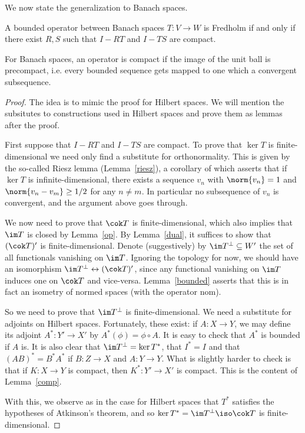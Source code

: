 \documentclass[12pt]{article}
\begin{document}
We now state the generalization to Banach spaces.
\begin{thm}A bounded operator between Banach spaces $T:V \to W$ is Fredholm if and only if there exist $R,S$ such that $I-RT$ and $I-TS$ are compact.\end{thm}
For Banach spaces, an operator is compact if the image of the unit ball is precompact, i.e. every bounded sequence gets mapped to one which a convergent subsequence.

\begin{proof}The idea is to mimic the proof for Hilbert spaces. We will mention the subsitutes to constructions used in Hilbert spaces and prove them as lemmas after the proof.

First suppose that $I-RT$ and $I-TS$ are compact. To prove that $\ker T$ is finite-dimensional we need only find a substitute for orthonormality. This is given by the so-called Riesz lemma (Lemma~\ref{riesz}), a corollary of which asserts that if $\ker T$ is infinite-dimensional, there exists a sequence $v_n$ with $\norm{v_n} = 1$ and $\norm{v_n-v_m} \geq 1/2$ for any $n\neq m$. In particular no subsequence of $v_n$ is convergent, and the argument above goes through.

We now need to prove that $\cok T$ is finite-dimensional, which also implies that $\im T$ is closed by Lemma~\ref{op}. By Lemma~\ref{dual}, it suffices to show that $(\cok T)'$ is finite-dimensional.
Denote (suggestively) by $\im T^\bot \subseteq W'$ the set of all functionals vanishing on $\im T$. Ignoring the topology for now, we should have an isomorphism $\im T^\bot \leftrightarrow (\cok T)'$, since any functional vanishing on $\im T$ induces one on $\cok T$ and vice-versa. Lemma~\ref{bounded} asserts that this is in fact an isometry of normed spaces (with the operator nom).

So we need to prove that $\im T^\bot$ is finite-dimensional. We need a substitute for adjoints on Hilbert spaces. Fortunately, these exist: if $A:X\to Y$, we may define its adjoint $A^\ast: Y' \to X'$ by $A^\ast(\phi)= \phi\circ A$. It is easy to check that $A^\ast$ is bounded if $A$ is. It is also clear that $\im T^\bot = \ker T^\ast$, that $I^\ast = I$ and that $(AB)^\ast = B^\ast A^\ast$ if $B:Z\to X$ and $A:Y \to Y$. What is slightly harder to check is that if $K:X\to Y$ is compact, then $K^\ast:Y' \to X'$ is compact. This is the content of Lemma~\ref{comp}.

With this, we observe as in the case for Hilbert spaces that $T^\ast$ satisfies the hypotheses of Atkinson's theorem, and so $\ker T^\ast = \im T^\bot \iso \cok T$ is finite-dimensional.


\end{proof}
\end{document}
